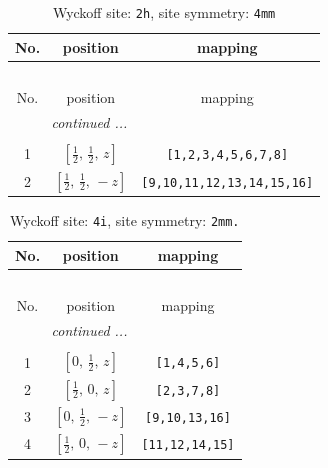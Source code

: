 \documentclass[fleqn,8pt]{jsarticle}
\begin{document}
\begin{longtable}{ccc}
\caption{Wyckoff site: {\tt 2h}, site symmetry: {\tt 4mm}}
 \\
 \hline \hline
No. & position & mapping \\ \hline \endfirsthead

\multicolumn{2}{l}{\tablename\ \thetable{}} \\
 \hline \hline
No. & position & mapping \\ \hline \endhead

 \hline \hline
\multicolumn{2}{r}{\footnotesize\it continued ...} \\ \endfoot

 \hline \hline
\multicolumn{2}{r}{} \\ \endlastfoot

1 & $\left[ \frac{1}{2},\, \frac{1}{2},\, z \right]$ & {\tt [1,2,3,4,5,6,7,8]} \\ \hline
2 & $\left[ \frac{1}{2},\, \frac{1}{2},\, - z \right]$ & {\tt [9,10,11,12,13,14,15,16]} \\
\end{longtable}
\renewcommand{\arraystretch}{1.2}
\begin{longtable}{ccc}
\caption{Wyckoff site: {\tt 4i}, site symmetry: {\tt 2mm.}}
 \\
 \hline \hline
No. & position & mapping \\ \hline \endfirsthead

\multicolumn{2}{l}{\tablename\ \thetable{}} \\
 \hline \hline
No. & position & mapping \\ \hline \endhead

 \hline \hline
\multicolumn{2}{r}{\footnotesize\it continued ...} \\ \endfoot

 \hline \hline
\multicolumn{2}{r}{} \\ \endlastfoot

1 & $\left[ 0,\, \frac{1}{2},\, z \right]$ & {\tt [1,4,5,6]} \\ \hline
2 & $\left[ \frac{1}{2},\, 0,\, z \right]$ & {\tt [2,3,7,8]} \\ \hline
3 & $\left[ 0,\, \frac{1}{2},\, - z \right]$ & {\tt [9,10,13,16]} \\ \hline
4 & $\left[ \frac{1}{2},\, 0,\, - z \right]$ & {\tt [11,12,14,15]} \\
\end{longtable}
\renewcommand{\arraystretch}{1.2}
\end{document}
